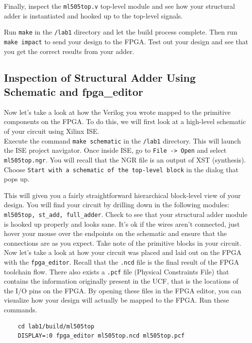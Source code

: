 \documentclass[11pt]{article}
\begin{document}
Finally, inspect the \verb|ml505top.v| top-level module and see how your structural adder is instantiated and hooked up to the top-level signals.

Run \verb|make| in the \verb|/lab1| directory and let the build process complete. Then run \verb|make impact| to send your design to the FPGA. Test out your design and see that you get the correct results from your adder.

\subsection{Inspection of Structural Adder Using Schematic and fpga\_editor}
Now let's take a look at how the Verilog you wrote mapped to the primitive components on the FPGA. To do this, we will first look at a high-level schematic of your circuit using Xilinx ISE.\\

Execute the command \verb|make schematic| in the \verb|/lab1| directory. This will launch the ISE project navigator. Once inside ISE, go to \verb|File -> Open| and select \verb|ml505top.ngr|. You will recall that the NGR file is an output of XST (synthesis). Choose \verb|Start with a schematic of the top-level block| in the dialog that pops up.

This will given you a fairly straightforward hierarchical block-level view of your design. You will find your circuit by drilling down in the following modules: \verb|ml505top, st_add, full_adder|. Check to see that your structural adder module is hooked up properly and looks sane. It's ok if the wires aren't connected, just hover your mouse over the endpoints on the schematic and ensure that the connections are as you expect. Take note of the primitive blocks in your circuit.\\

Now let's take a look at how your circuit was placed and laid out on the FPGA with the \verb|fpga_editor|. Recall that the \verb|.ncd| file is the final result of the FPGA toolchain flow. There also exists a \verb|.pcf| file (Physical Constraints File) that contains the information originally present in the UCF, that is the locations of the I/O pins on the FPGA. By opening these files in the FPGA editor, you can visualize how your design will actually be mapped to the FPGA. Run these commands.

\begin{verbatim}
	cd lab1/build/ml505top
	DISPLAY=:0 fpga_editor ml505top.ncd ml505top.pcf
\end{verbatim}
\end{document}
